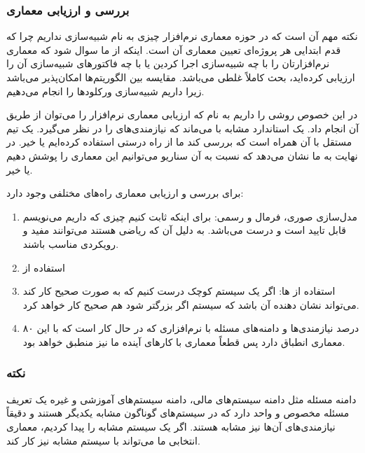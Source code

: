 \documentclass[a4paper]{article}
\begin{document}
\subsubsection{بررسی و ارزیابی معماری}

نکته مهم آن است که در حوزه معماری نرم‌افزار چیزی به نام شبیه‌سازی نداریم چرا که
قدم ابتدایی هر پروژه‌ای تعیین معماری آن است. اینکه از ما سوال شود که معماری
نرم‌افزارتان را با چه شبیه‌سازی اجرا کردین یا با چه فاکتور‌های شبیه‌سازی آن را
ارزیابی کرده‌اید، بحث کاملاً غلطی می‌باشد. مقایسه بین الگوریتم‌ها امکان‌پذیر
می‌باشد زیرا داریم شبیه‌سازی ورکلود‌ها را انجام می‌دهیم.

در این خصوص روشی را داریم به نام  که ارزیابی معماری نرم‌افزار را
می‌توان از طریق آن انجام داد. یک استاندارد مشابه با  می‌ماند که
نیازمندی‌های  را در نظر می‌گیرد. یک تیم مستقل با آن همراه است
که بررسی کند ما از راه درستی استفاده کرده‌ایم یا خیر. در نهایت به ما نشان می‌دهد
که نسبت به آن سناریو می‌توانیم این معماری را پوشش دهیم یا خیر.

برای بررسی و ارزیابی معماری راه‌های مختلفی وجود دارد:

\begin{enumerate}
    \item مدل‌سازی صوری، فرمال و رسمی: برای اینکه ثابت کنیم چیزی که داریم
    می‌نویسم قابل تایید است و درست می‌باشد. به دلیل آن که ریاضی هستند می‌توانند
    مفید و رویکردی مناسب باشند.
    \item استفاده از 
    \item استفاده از ها: اگر یک سیستم کوچک درست کنیم که به
    صورت صحیح کار کند می‌تواند نشان دهنده آن باشد که سیستم اگر بزرگتر شود هم
    صحیح کار خواهد کرد.
    \item ۸۰ درصد نیازمندی‌ها و دامنه‌های مسئله با نرم‌افزاری که در حال کار است
    که با این معماری انطباق دارد پس قطعاً معماری با کار‌های آینده ما نیز منطبق
    خواهد بود.
\end{enumerate}

\subsubsection*{نکته}

دامنه مسئله مثل دامنه سیستم‌های مالی، دامنه سیستم‌های آموزشی و غیره یک تعریف
مسئله مخصوص و واحد دارد که در سیستم‌های گوناگون مشابه یکدیگر هستند و دقیقاً
نیازمندی‌های آن‌ها نیز مشابه هستند. اگر یک سیستم مشابه را پیدا کردیم، معماری
انتخابی ما می‌تواند با سیستم مشابه نیز کار کند.
\end{document}
